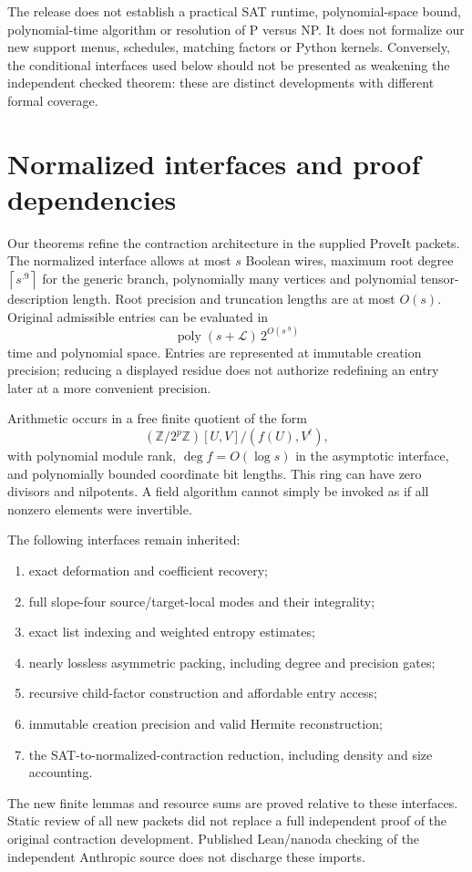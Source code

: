 \documentclass[11pt,letterpaper]{article}
\theoremstyle{remark}\newtheorem{remark}[theorem]{Remark}
\newcommand{\poly}{\operatorname{poly}}\newcommand{\vTwo}{v_2}\newcommand{\ceil}[1]{\left\lceil#1\right\rceil}\newcommand{\floor}[1]{\left\lfloor#1\right\rfloor}\newcommand{\LL}{\mathcal L}
\begin{document}
The release does not establish a practical SAT runtime, polynomial-space bound, polynomial-time algorithm or resolution of P versus NP. It does not formalize our new support menus, schedules, matching factors or Python kernels. Conversely, the conditional interfaces used below should not be presented as weakening the independent checked theorem: these are distinct developments with different formal coverage.

\section{Normalized interfaces and proof dependencies}
\label{sec:interface}
Our theorems refine the contraction architecture in the supplied ProveIt packets. The normalized interface allows at most $s$ Boolean wires, maximum root degree $\ceil{s^{.9}}$ for the generic branch, polynomially many vertices and polynomial tensor-description length. Root precision and truncation lengths are at most $O(s)$. Original admissible entries can be evaluated in
\[
 \poly(s+\LL)\,2^{O(s^{.9})}
\]
time and polynomial space. Entries are represented at immutable creation precision; reducing a displayed residue does not authorize redefining an entry later at a more convenient precision.

Arithmetic occurs in a free finite quotient of the form
\begin{equation}\label{eq:ring}
 (\mathbb Z/2^p\mathbb Z)[U,V]/(f(U),V^\ell),
\end{equation}
with polynomial module rank, $\deg f=O(\log s)$ in the asymptotic interface, and polynomially bounded coordinate bit lengths. This ring can have zero divisors and nilpotents. A field algorithm cannot simply be invoked as if all nonzero elements were invertible.

The following interfaces remain inherited:
\begin{enumerate}
\item exact deformation and coefficient recovery;
\item full slope-four source/target-local modes and their integrality;
\item exact list indexing and weighted entropy estimates;
\item nearly lossless asymmetric packing, including degree and precision gates;
\item recursive child-factor construction and affordable entry access;
\item immutable creation precision and valid Hermite reconstruction;
\item the SAT-to-normalized-contraction reduction, including density and size accounting.
\end{enumerate}
The new finite lemmas and resource sums are proved relative to these interfaces. Static review of all new packets did not replace a full independent proof of the original contraction development. Published Lean/nanoda checking of the independent Anthropic source does not discharge these imports.
\end{document}
